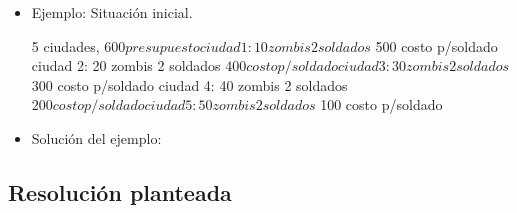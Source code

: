 \begin{itemize}
\item Ejemplo: Situación inicial.

\begin{codesnippet}
5 ciudades, $ 600 presupuesto
ciudad 1: 10 zombis 2 soldados $ 500 costo p/soldado
ciudad 2: 20 zombis 2 soldados $ 400 costo p/soldado
ciudad 3: 30 zombis 2 soldados $ 300 costo p/soldado
ciudad 4: 40 zombis 2 soldados $ 200 costo p/soldado
ciudad 5: 50 zombis 2 soldados $ 100 costo p/soldado
\end{codesnippet}
\item Solución del ejemplo:

\end{itemize}

\subsection{Resolución planteada}

